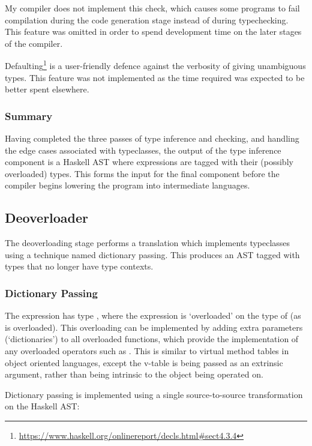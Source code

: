 \documentclass[dissertation.tex]{subfiles}
\begin{document}
{{{            My compiler does not implement this check, which causes some programs to fail compilation during the code generation stage instead of during typechecking. This feature was omitted in order to spend development time on the later stages of the compiler.

            Defaulting\footnote{\url{https://www.haskell.org/onlinereport/decls.html\#sect4.3.4}} is a user-friendly defence against the verbosity of giving unambiguous types. This feature was not implemented as the time required was expected to be better spent elsewhere.
        }
        \subsubsection*{Summary}
        {
            Having completed the three passes of type inference and checking, and handling the edge cases associated with typeclasses, the output of the type inference component is a Haskell AST where expressions are tagged with their (possibly overloaded) types. This forms the input for the final component before the compiler begins lowering the program into intermediate languages.   
        }
    }
    \subsection{Deoverloader}\label{sec:deoverloading}
    {
        The deoverloading stage performs a translation which implements typeclasses using a technique named dictionary passing. This produces an AST tagged with types that no longer have type contexts.

        \subsubsection{Dictionary Passing}
        {
            The expression  has type , where the expression is `overloaded' on the type of  (as \haskell{(+)} is overloaded). This overloading can be implemented by adding extra parameters (`dictionaries') to all overloaded functions, which provide the implementation of any overloaded operators such as \haskell{(+)}. This is similar to virtual method tables in object oriented languages, except the v-table is being passed as an extrinsic argument, rather than being intrinsic to the object being operated on.

            Dictionary passing is implemented using a single source-to-source transformation on the Haskell AST:
            
}}}
\end{document}
